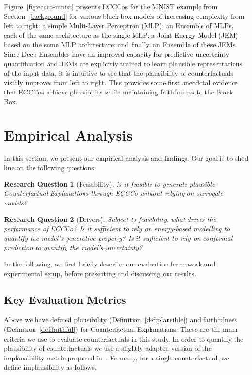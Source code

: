 \documentclass{article}
\newtheorem{question}{Research Question}[section]
\begin{document}
Figure~\ref{fig:eccco-mnist} presents ECCCos for the MNIST example from Section~\ref{background} for various black-box models of increasing complexity from left to right: a simple Multi-Layer Perceptron (MLP); an Ensemble of MLPs, each of the same architecture as the single MLP; a Joint Energy Model (JEM) based on the same MLP architecture; and finally, an Ensemble of these JEMs. Since Deep Ensembles have an improved capacity for predictive uncertainty quantification and JEMs are explicitly trained to learn plausible representations of the input data, it is intuitive to see that the plausibility of counterfactuals visibly improves from left to right. This provides some first anecdotal evidence that ECCCos achieve plausibility while maintaining faithfulness to the Black Box. 

\section{Empirical Analysis}\label{emp}

In this section, we present our empirical analysis and findings. Our goal is to shed line on the following questions:

\begin{question}[Feasibility]\label{rq:feasibility}
  Is it feasible to generate plausible Counterfactual Explanations through ECCCo without relying on surrogate models?
\end{question}

\begin{question}[Drivers]\label{rq:drivers}
  Subject to feasibility, what drives the performance of ECCCo? Is it sufficient to rely on energy-based modelling to quantify the model's generative property? Is it sufficient to rely on conformal prediction to quantify the model's uncertainty?
\end{question}

In the following, we first briefly describe our evaluation framework and experimental setup, before presenting and discussing our results.

\subsection{Key Evaluation Metrics}\label{evaluation}

Above we have defined plausibility (Definition~\ref{def:plausible}) and faithfulness (Definition~\ref{def:faithful}) for Counterfactual Explanations. These are the main criteria we use to evaluate counterfactuals in this study. In order to quantify the plausibility of counterfactuals we use a slightly adapted version of the implausibility metric proposed in~\citet{guidotti2022counterfactual}. Formally, for a single counterfactual, we define implausibility as follows,
\end{document}
